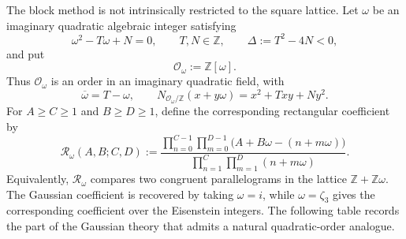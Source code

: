 \documentclass[a4paper,american,11pt]{amsart}
\numberwithin{equation}{section}
\theoremstyle{definition}
\newcommand{\Z}{\mathbb Z}
\begin{document}
The block method is not intrinsically restricted to the square lattice.  Let
$\omega$ be an imaginary quadratic algebraic integer satisfying
\begin{equation}\label{eq:omega-minimal-polynomial}
\omega^2-T\omega+N=0,
\qquad
T,N\in\Z,
\qquad
\Delta:=T^2-4N<0,
\end{equation}
and put
\[
\mathcal O_\omega:=\Z[\omega].
\]
Thus $\mathcal O_\omega$ is an order in an imaginary quadratic field, with
\[
\overline\omega=T-\omega,
\qquad
N_{\mathcal O_\omega/\Z}(x+y\omega)
=x^2+Txy+Ny^2.
\]
For $A\geq C\geq1$ and $B\geq D\geq1$, define the corresponding rectangular coefficient by
\begin{equation}\label{eq:omega-rectangular-coefficient}
\mathcal R_\omega(A,B;C,D)
:=
\frac{
\displaystyle
\prod_{n=0}^{C-1}\prod_{m=0}^{D-1}
\bigl(A+B\omega-(n+m\omega)\bigr)
}{
\displaystyle
\prod_{n=1}^{C}\prod_{m=1}^{D}(n+m\omega)
}.
\end{equation}
Equivalently, $\mathcal R_\omega$ compares two congruent parallelograms in the lattice
$\Z+\Z\omega$.  The Gaussian coefficient is recovered by taking $\omega=i$, while
$\omega=\zeta_3$ gives the corresponding coefficient over the Eisenstein integers.
The following table records the part of the Gaussian theory that admits a natural
quadratic-order analogue.
\end{document}

